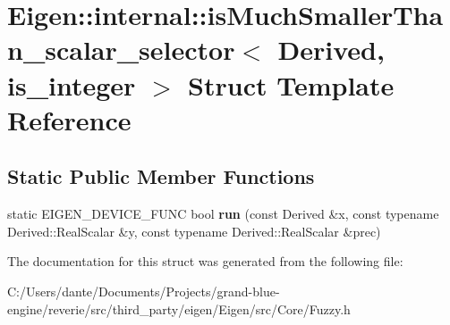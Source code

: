 \hypertarget{struct_eigen_1_1internal_1_1is_much_smaller_than__scalar__selector}{}\section{Eigen\+::internal\+::is\+Much\+Smaller\+Than\+\_\+scalar\+\_\+selector$<$ Derived, is\+\_\+integer $>$ Struct Template Reference}
\label{struct_eigen_1_1internal_1_1is_much_smaller_than__scalar__selector}
\subsection*{Static Public Member Functions}
\begin{DoxyCompactItemize}
\item 
\mbox{\label{struct_eigen_1_1internal_1_1is_much_smaller_than__scalar__selector_a802c0b9a49ce1e6e9f31f6e64258acd8}} 
static E\+I\+G\+E\+N\+\_\+\+D\+E\+V\+I\+C\+E\+\_\+\+F\+U\+NC bool {\bfseries run} (const Derived \&x, const typename Derived\+::\+Real\+Scalar \&y, const typename Derived\+::\+Real\+Scalar \&prec)
\end{DoxyCompactItemize}


The documentation for this struct was generated from the following file\+:\begin{DoxyCompactItemize}
\item 
C\+:/\+Users/dante/\+Documents/\+Projects/grand-\/blue-\/engine/reverie/src/third\+\_\+party/eigen/\+Eigen/src/\+Core/Fuzzy.\+h\end{DoxyCompactItemize}
